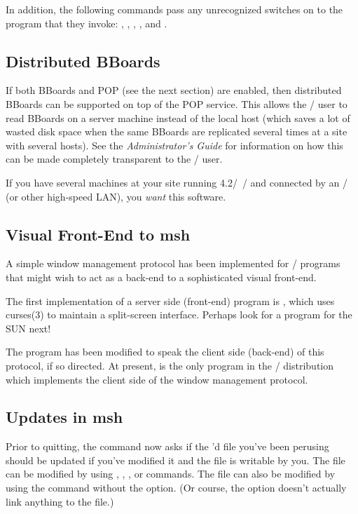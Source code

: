 In addition, the following commands
pass any unrecognized switches on to the program that they invoke:
, , , , and .

\subsection*	{Distributed BBoards}
If both BBoards and POP (see the next section) are enabled,
then distributed BBoards can be supported on top of the POP service.
This allows the \MH/ user to read BBoards on a server machine
instead of the local host
(which saves a lot of wasted disk space when the same BBoards are replicated
several times at a site with several hosts).
See the {\em Administrator's Guide\/} for information on how this can be made
completely transparent to the \MH/ user.

If you have several machines at your site running 4.2\bsd/~\unix/
and connected by an \ethernet/ (or other high-speed LAN),
you {\em want\/} this software.

\subsection*	{Visual Front-End to msh}
A simple window management protocol has been implemented for \MH/ programs
that might wish to act as a back-end to a sophisticated visual front-end.

The first implementation of a server side (front-end) program is ,
which uses \man curses(3) to maintain a split-screen interface.
Perhaps look for a  program for the SUN next!

The  program has been modified to speak the client side (back-end)
of this protocol, if so directed.
At present,  is the only program in the \MH/ distribution which
implements the client side of the window management protocol.

\subsection*	{Updates in msh}
Prior to quitting,
the  command now asks if the 'd file you've been
perusing should be updated if you've modified it and the file is writable by
you.
The file can be modified by using , , ,
or  commands.
The file can also be modified by using the  command without the
 option.
(Or course,
the  option doesn't actually link anything to the file.)

